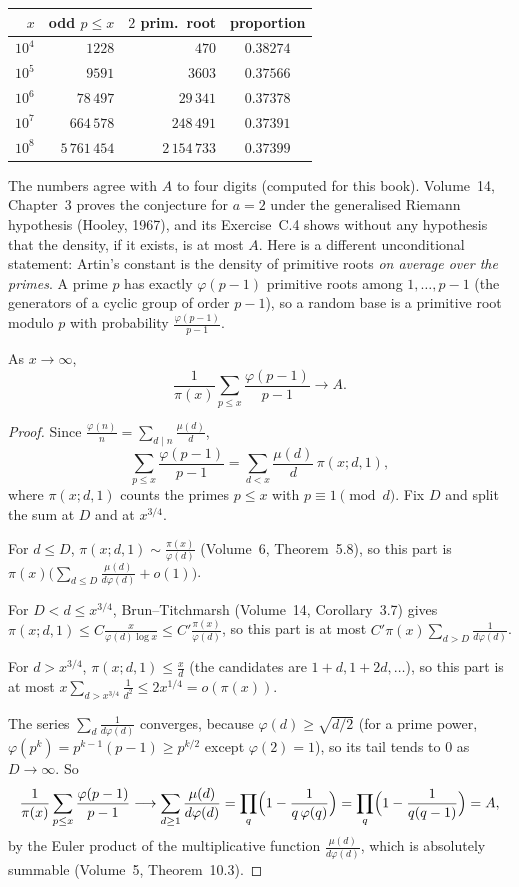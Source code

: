 \begin{center}\small
\begin{tabular}{rrrc}
$x$&odd $p\le x$&$2$ prim.\ root&proportion\\\hline
$10^4$&$1228$&$470$&$0.38274$\\
$10^5$&$9591$&$3603$&$0.37566$\\
$10^6$&$78\,497$&$29\,341$&$0.37378$\\
$10^7$&$664\,578$&$248\,491$&$0.37391$\\
$10^8$&$5\,761\,454$&$2\,154\,733$&$0.37399$
\end{tabular}
\end{center}

The numbers agree with $A$ to four digits (computed for this book). Volume~14, Chapter~3 proves the conjecture for $a=2$ under the generalised Riemann
hypothesis (Hooley, 1967), and its Exercise~C.4 shows without any hypothesis that the density, if it exists, is at most $A$. Here is a different unconditional
statement: Artin's constant is the density of primitive roots \emph{on average over the primes}. A prime $p$ has exactly $\varphi(p-1)$ primitive roots among
$1,\dots,p-1$ (the generators of a cyclic group of order $p-1$), so a random base is a primitive root modulo $p$ with probability $\frac{\varphi(p-1)}{p-1}$.

\begin{theorem}\label{conjectures:thm:artinavg}
As $x\to\infty$,
\[
\frac1{\pi(x)}\sum_{p\le x}\frac{\varphi(p-1)}{p-1}\longrightarrow A.
\]
\end{theorem}
\begin{proof}
Since $\frac{\varphi(n)}n=\sum_{d\mid n}\frac{\mu(d)}d$,
\[
\sum_{p\le x}\frac{\varphi(p-1)}{p-1}=\sum_{d<x}\frac{\mu(d)}d\,\pi(x;d,1),
\]
where $\pi(x;d,1)$ counts the primes $p\le x$ with $p\equiv1\pmod d$. Fix $D$ and split the sum at $D$ and at $x^{3/4}$.

For $d\le D$, $\pi(x;d,1)\sim\frac{\pi(x)}{\varphi(d)}$ (Volume~6, Theorem~5.8), so this part is $\pi(x)\bigl(\sum_{d\le D}\frac{\mu(d)}{d\varphi(d)}+o(1)\bigr)$.

For $D<d\le x^{3/4}$, Brun--Titchmarsh (Volume~14, Corollary~3.7) gives $\pi(x;d,1)\le C\frac x{\varphi(d)\log x}\le C'\frac{\pi(x)}{\varphi(d)}$, so this part is at
most $C'\pi(x)\sum_{d>D}\frac1{d\varphi(d)}$.

For $d>x^{3/4}$, $\pi(x;d,1)\le\frac xd$ (the candidates are $1+d,1+2d,\dots$), so this part is at most $x\sum_{d>x^{3/4}}\frac1{d^2}\le2x^{1/4}=o(\pi(x))$.

The series $\sum_d\frac1{d\varphi(d)}$ converges, because $\varphi(d)\ge\sqrt{d/2}$ (for a prime power, $\varphi(p^k)=p^{k-1}(p-1)\ge p^{k/2}$ except $\varphi(2)=1$), so its tail tends to $0$ as $D\to\infty$. So
\[
\frac1{\pi(x)}\sum_{p\le x}\frac{\varphi(p-1)}{p-1}\longrightarrow\sum_{d\ge1}\frac{\mu(d)}{d\varphi(d)}=\prod_q\Bigl(1-\frac1{q\,\varphi(q)}\Bigr)=\prod_q\Bigl(1-\frac1{q(q-1)}\Bigr)=A,
\]
by the Euler product of the multiplicative function $\frac{\mu(d)}{d\varphi(d)}$, which is absolutely summable (Volume~5, Theorem~10.3).
\end{proof}

